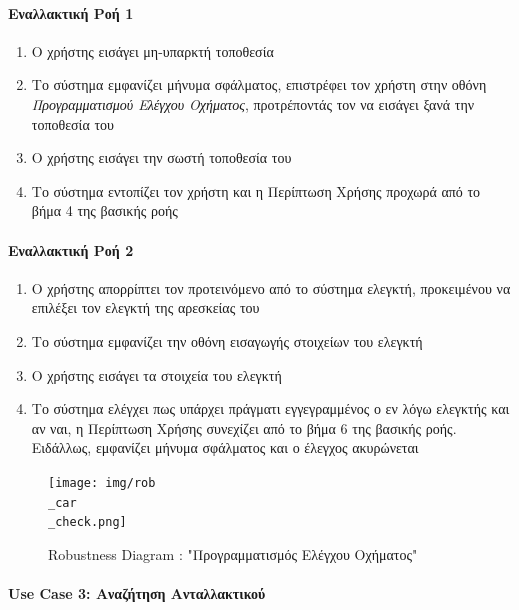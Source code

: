 \documentclass{../ol-softwaremanual}
\begin{document}
		\paragraph{Εναλλακτική Ροή 1}
		
		\begin{enumerate}
			\item Ο χρήστης εισάγει μη-υπαρκτή τοποθεσία
			\item Το σύστημα εμφανίζει μήνυμα σφάλματος, επιστρέφει τον χρήστη στην οθόνη \textit{Προγραμματισμού Ελέγχου Οχήματος}, προτρέποντάς τον να εισάγει ξανά την τοποθεσία του
			\item Ο χρήστης εισάγει την σωστή τοποθεσία του
			\item Το σύστημα εντοπίζει τον χρήστη και η Περίπτωση Χρήσης προχωρά από το βήμα 4 της βασικής ροής
		\end{enumerate}
		
		\paragraph{Εναλλακτική Ροή 2}
		
		\begin{enumerate}
			\item Ο χρήστης απορρίπτει τον προτεινόμενο από το σύστημα ελεγκτή, προκειμένου να επιλέξει τον ελεγκτή της αρεσκείας του
			\item Το σύστημα εμφανίζει την οθόνη εισαγωγής στοιχείων του ελεγκτή
			\item Ο χρήστης εισάγει τα στοιχεία του ελεγκτή
			\item Το σύστημα ελέγχει πως υπάρχει πράγματι εγγεγραμμένος ο εν λόγω ελεγκτής και αν ναι, η Περίπτωση Χρήσης συνεχίζει από το βήμα 6 της βασικής ροής. Ειδάλλως, εμφανίζει μήνυμα σφάλματος και ο έλεγχος ακυρώνεται	
		\end{enumerate}	
	
	
	\begin{figure}[htbp!]
		\texttt{[image: img/rob\\\_car\\\_check.png]}
		\caption{\en Robustness Diagram : "\gr Προγραμματισμός Ελέγχου Οχήματος\en"\gr}
	\end{figure}
	
	
	\newpage
	\centering
	
	\paragraph{\en Use Case 3: \gr Αναζήτηση Ανταλλακτικού}	
	
\end{document}
